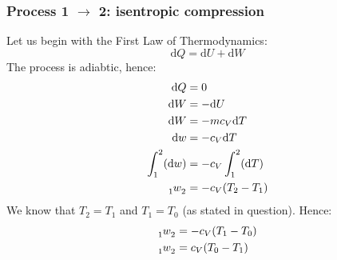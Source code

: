 \documentclass[12pt]{article}
\numberwithin{equation}{section}
\begin{document}
\begin{flushleft}
\subsubsection*{Process 1 $\rightarrow$ 2: isentropic compression}
Let us begin with the First Law of Thermodynamics:
\begin{equation}
  \mathrm{d}Q = \mathrm{d}U + \mathrm{d}W
\end{equation}
The process is adiabtic, hence:
\begin{align}
  \mathrm{d}Q &= 0\\
  \mathrm{d}W &= - \mathrm{d}U\\
  \mathrm{d}W &= -m c_V \mathrm{d}T\\
  \mathrm{d}w &= - c_V \mathrm{d}T\\
  \int_1^2(\mathrm{d}w) &= -c_V \int_1^2(\mathrm{d}T)\\
  \tensor[_1]{w}{_2} &= -c_V (T_2 - T_1)\\
\end{align}
We know that $T_2 = T_1$ and $T_1 = T_0$ (as stated in question). Hence:
\begin{align}
  \tensor[_1]{w}{_2} &= -c_V (T_1 - T_0)\\
  \tensor[_1]{w}{_2} &= c_V (T_0 - T_1)
\end{align}


\end{flushleft}
\end{document}
